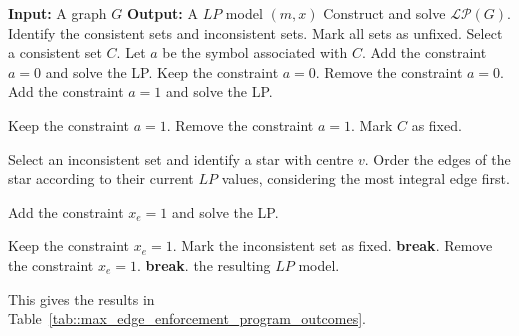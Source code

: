\documentclass[11pt]{report}
\begin{document}
\begin{algorithm} \caption{Greedy edge enforcement}
\label{algorithm::greedy_edge_enforcement}
  \begin{algorithmic}[1]
    \State \textbf{Input:} A graph $G$
    \State \textbf{Output:} A $LP$ model $(m,x)$
    \State Construct and solve $\mathcal{LP}(G)$.
    \State Identify the consistent sets and inconsistent sets.
    \State Mark all sets as unfixed.
          \State Select a consistent set $C$.
          \State Let $a$ be the symbol associated with $C$.
          \State Add the constraint $a=0$ and solve the LP.
              \State Keep the constraint $a=0$.
          \Else
              \State Remove the constraint $a=0$.
              \State Add the constraint $a=1$ and solve the LP.

                  \State Keep the constraint $a=1$.
              \Else
                  \State Remove the constraint $a=1$.
              \EndIf
          \EndIf
          \State Mark $C$ as fixed.

          \State Select an inconsistent set and identify a star
          \State with centre $v$.
          \State Order the edges of the star according to their
          \State current $LP$ values, considering the most integral edge first.

              \State Add the constraint $x_e=1$ and solve the LP.

                  \State Keep the constraint $x_e=1$.
                  \State Mark the inconsistent set as fixed.
                  \State \textbf{break}.
              \Else
                  \State Remove the constraint $x_e=1$.
              \EndIf
          \EndFor
      \Else
          \State \textbf{break}.
      \EndIf
    \EndWhile
    \State \Return the resulting $LP$ model.
  \end{algorithmic}
\end{algorithm}

This gives the results in Table~\ref{tab::max_edge_enforcement_program_outcomes}. 
\end{document}
